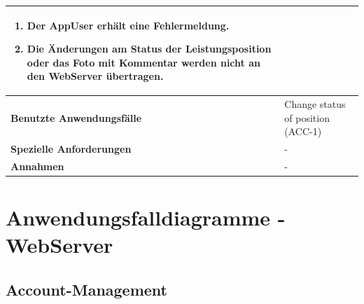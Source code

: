 \begin{longtable}[c]{|p{4cm}|p{10cm}|}
\begin{enumerate}
        \item Der AppUser erh\"alt eine Fehlermeldung.
        \item Die \"Anderungen am Status der Leistungsposition oder das Foto mit Kommentar werden nicht an den WebServer \"ubertragen.
    \end{enumerate}                                                                                                                                                                                                                                                                                                                                     \\ \hline
    \textbf{Benutzte Anwendungsfälle}   & Change status of position (ACC-1)                                                                                                                                                                                                                                                                                               \\ \hline
    \textbf{Spezielle Anforderungen}    & -                                                                                                                                                                                                                                                                                                                        \\ \hline
    \textbf{Annahmen}                   & -                                                                                                                                                                                                                                                                                                                        \\ \hline
\end{longtable}

\clearpage

\section{Anwendungsfalldiagramme - WebServer}

\subsection{Account-Management}

